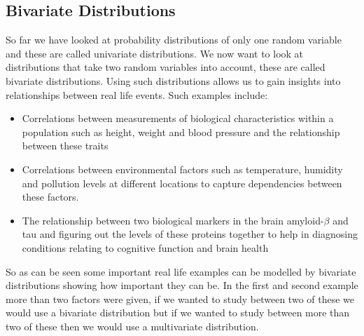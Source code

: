 \documentclass[,oneside]{article}
\begin{document}
\begin{enumerate}
\section{Bivariate Distributions}
So far we have looked at probability distributions of only one random variable and these are called univariate distributions. We now want to look at distributions that take two random variables into account, these are called bivariate distributions. Using such distributions allows us to gain insights into relationships between real life events. Such examples include:\\ 
\begin{itemize}
\item Correlations between measurements of biological characteristics within a population such as height, weight and blood pressure and the relationship between these traits
\item Correlations between environmental factors such as temperature, humidity and pollution levels at different locations to capture dependencies between these factors.
\item The relationship between two biological markers in the brain amyloid-$\beta$ and tau and figuring out the levels of these proteins together to help in diagnosing conditions relating to cognitive function and brain health 
\end{itemize}
So as can be seen some important real life examples can be modelled by bivariate distributions showing how important they can be. In the first and second example more than two factors were given, if we wanted to study between two of these we would use a bivariate distribution but if we wanted to study between more than two of these then we would use a multivariate distribution.\\

\end{enumerate}
\end{document}
